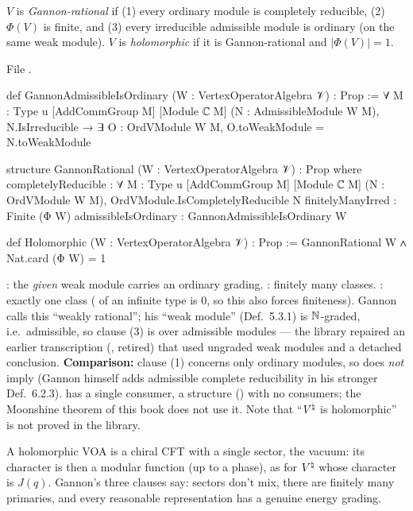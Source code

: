 \begin{definition}\label{l12:def:gannon}
$V$ is \emph{Gannon-rational} if (1) every ordinary module is completely reducible, (2) $\Phi(V)$ is finite, and (3) every
irreducible admissible module is ordinary (on the same weak module). $V$ is \emph{holomorphic} if it is Gannon-rational
and $|\Phi(V)| = 1$.
\end{definition}
\noindent File .
\begin{leancode}
def GannonAdmissibleIsOrdinary (W : VertexOperatorAlgebra 𝒱) : Prop :=
  ∀ {M : Type u} [AddCommGroup M] [Module ℂ M] (N : AdmissibleModule W M),
    N.IsIrreducible → ∃ O : OrdVModule W M, O.toWeakModule = N.toWeakModule

structure GannonRational (W : VertexOperatorAlgebra 𝒱) : Prop where
  completelyReducible : ∀ {M : Type u} [AddCommGroup M] [Module ℂ M] (N : OrdVModule W M),
    OrdVModule.IsCompletelyReducible N
  finitelyManyIrred : Finite (Φ W)
  admissibleIsOrdinary : GannonAdmissibleIsOrdinary W

def Holomorphic (W : VertexOperatorAlgebra 𝒱) : Prop :=
  GannonRational W ∧ Nat.card (Φ W) = 1
\end{leancode}

\begin{dictionary}
: the \emph{given} weak module carries an ordinary grading.
: finitely many classes. : exactly one class ( of an infinite
type is $0$, so this also forces finiteness). Gannon calls this ``weakly rational''; his ``weak module'' (Def.~5.3.1) is
${\mathbb{N}}$-graded, i.e.\ admissible, so clause (3) is over admissible modules --- the library repaired an earlier transcription
(, retired) that used ungraded weak modules and a detached conclusion. \textbf{Comparison:} clause (1)
concerns only ordinary modules, so  does \emph{not} imply  (Gannon himself
adds admissible complete reducibility in his stronger Def.~6.2.3).  has a single consumer, a structure
() with no consumers; the Moonshine theorem of this book does not use it. Note that
``${V^{\natural}}$ is holomorphic'' is not proved in the library.
\end{dictionary}

\begin{physics}
A holomorphic VOA is a chiral CFT with a single sector, the vacuum: its character is then a modular function (up to a
phase), as for ${V^{\natural}}$ whose character is $J(q)$. Gannon's three clauses say: sectors don't mix, there are finitely many
primaries, and every reasonable representation has a genuine energy grading.
\end{physics}

